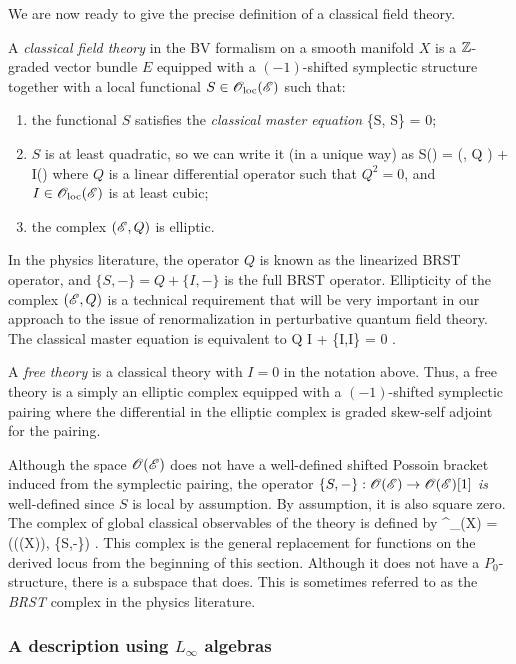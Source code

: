 We are now ready to give the precise definition of a classical field theory.

\begin{dfn}
A {\em classical field theory} in the BV formalism on a smooth manifold $X$ is a $\mathbb Z$-graded vector bundle $E$ equipped with a $(-1)$-shifted symplectic structure together with a local functional $S \in {\mathscr O}_{\rm loc}(\mathscr E)$ such that:
\begin{enumerate}
\item the functional $S$ satisfies the {\em classical master equation} 
\ben
\{S, S\} = 0;
\een
\item $S$ is at least quadratic, so we can write it (in a unique way) as 
\ben
S(\varphi) = \omega(\varphi, Q \varphi) + I(\varphi)
\een
where $Q$ is a linear differential operator such that $Q^2 = 0$, and  $I \in {\mathscr O}_{\rm loc}(\mathscr E)$ is at least cubic;
\item the complex $(\mathscr E, Q)$ is elliptic.
\end{enumerate}
\end{dfn}

In the physics literature, the operator $Q$ is known as the linearized BRST operator, and $\{S,-\} = Q + \{I,-\}$ is the full BRST operator.
Ellipticity of the complex $(\mathscr E,Q)$ is a technical requirement that will be very important in our approach to the issue of renormalization in perturbative quantum field theory.
The classical master equation is equivalent to
\ben
Q I +  \{I,I\} = 0 .
\een

A {\em free theory} is a classical theory with $I = 0$ in the notation above. 
Thus, a free theory is a simply an elliptic complex equipped with a $(-1)$-shifted symplectic pairing where the differential in the elliptic complex is graded skew-self adjoint for the pairing.  

Although the space $\mathscr O(\mathscr E)$ does not have a well-defined shifted Possoin bracket induced from the symplectic pairing, the operator $\{S,-\} : \mathscr O(\mathscr E) \to \mathscr O(\mathscr E)[1]$ {\em is} well-defined since $S$ is local by assumption. 
By assumption, it is also square zero. 
The complex of global classical observables of the theory is defined by
\ben
\Obs^{\cl}_{\sE}(X) = (\sO(\sE(X)), \{S,-\}) .
\een
This complex is the general replacement for functions on the derived locus from the beginning of this section.
Although it does not have a $P_0$-structure, there is a subspace that does. 
This is sometimes referred to as the {\em BRST} complex in the physics literature.

\subsubsection{A description using $L_\infty$ algebras}

